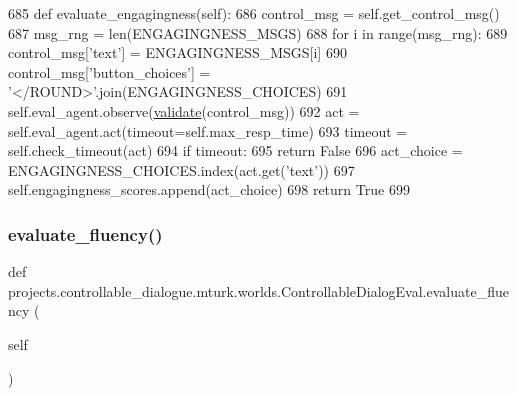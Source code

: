 \begin{DoxyCode}
685     \textcolor{keyword}{def }evaluate\_engagingness(self):
686         control\_msg = self.get\_control\_msg()
687         msg\_rng = len(ENGAGINGNESS\_MSGS)
688         \textcolor{keywordflow}{for} i \textcolor{keywordflow}{in} range(msg\_rng):
689             control\_msg[\textcolor{stringliteral}{'text'}] = ENGAGINGNESS\_MSGS[i]
690             control\_msg[\textcolor{stringliteral}{'button\_choices'}] = \textcolor{stringliteral}{'</ROUND>'}.join(ENGAGINGNESS\_CHOICES)
691             self.eval\_agent.observe(\hyperlink{namespaceparlai_1_1core_1_1worlds_afc3fad603b7bce41dbdc9cdc04a9c794}{validate}(control\_msg))
692             act = self.eval\_agent.act(timeout=self.max\_resp\_time)
693             timeout = self.check\_timeout(act)
694             \textcolor{keywordflow}{if} timeout:
695                 \textcolor{keywordflow}{return} \textcolor{keyword}{False}
696             act\_choice = ENGAGINGNESS\_CHOICES.index(act.get(\textcolor{stringliteral}{'text'}))
697             self.engagingness\_scores.append(act\_choice)
698         \textcolor{keywordflow}{return} \textcolor{keyword}{True}
699 
\end{DoxyCode}
\mbox{\label{classprojects_1_1controllable__dialogue_1_1mturk_1_1worlds_1_1ControllableDialogEval_a538109bcc5cab0cad4e9e9bddfdadae1}} 
\subsubsection{\texorpdfstring{evaluate\+\_\+fluency()}{evaluate\_fluency()}}
{\footnotesize\ttfamily def projects.\+controllable\+\_\+dialogue.\+mturk.\+worlds.\+Controllable\+Dialog\+Eval.\+evaluate\+\_\+fluency (\begin{DoxyParamCaption}\item[{}]{self }\end{DoxyParamCaption})}



